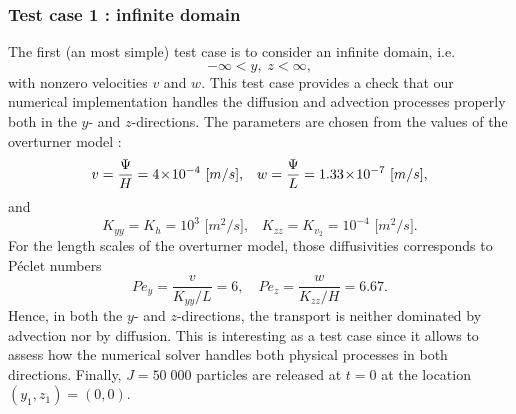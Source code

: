 \subsubsection{Test case 1 : infinite domain}
The first (an most simple) test case is to consider an infinite domain, i.e.
\begin{equation} \label{eq:testcase:domain}
	-\infty < y,\; z < \infty,
\end{equation}
with nonzero velocities $v$ and $w$. This test case provides a check that our numerical implementation handles the diffusion and advection processes properly both in the $y$- and $z$-directions. The parameters are chosen from the values of the overturner model :
\begin{equation}
	v = \frac{\Psi}{H} = 4\!\times\!10^{-4}\mbox{ [$m/s$],}\quad  w = \frac{\Psi}{L}=1.33\!\times\!10^{-7}\mbox{ [$m/s$],}
\end{equation}
and
\begin{equation}
	K_{yy} = K_h = 10^{3} \mbox{ [$m^2/s$],}\quad K_{zz} = K_{v_{2}} = 10^{-4} \mbox{ [$m^2/s$].} 
\end{equation}
For the length scales of the overturner model, those diffusivities corresponds to Péclet numbers
\begin{equation}
	Pe_y = \frac{v}{K_{yy}/L} = 6,\quad Pe_z = \frac{w}{K_{zz}/H} = 6.67.
\end{equation}
Hence, in both the $y$- and $z$-directions, the transport is neither dominated by advection nor by diffusion. This is interesting as a test case since it allows to assess how the numerical solver handles both physical processes in both directions. 
Finally, $J = 50\;000$ particles are released at $t=0$ at the location $(y_1,z_1) = (0,0)$.

